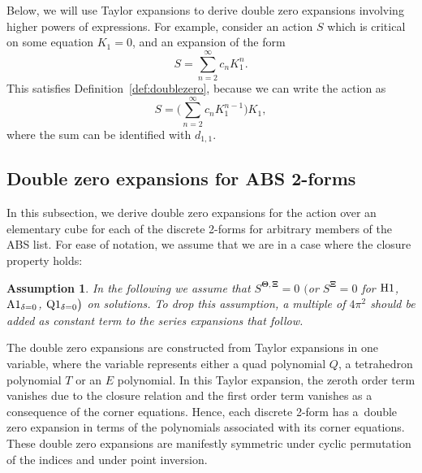 \documentclass[pdftex]{sigma}
\renewcommand{\vec}{\boldsymbol}
\newtheorem{Assumption}[Definition]{Assumption}
\numberwithin{equation}{section}
\begin{document}
Below, we will use Taylor expansions to derive double zero expansions involving higher powers of expressions. For example, consider an action $S$ which is critical on some equation $K_1 = 0$, and an expansion of the form
\[ S = \sum_{n = 2}^\infty c_{n} K_1^n . \]
This satisfies Definition~\ref{def:doublezero}, because we can write the action as
\[ S = \Biggl( \sum_{n = 2}^\infty c_{n} K_1^{n-1} \Biggr) K_1 , \]
where the sum can be identified with $d_{1,1}$.

\subsection{Double zero expansions for ABS 2-forms}
\label{sec-double0-ABS}

In this subsection, we derive double zero expansions for the action over an elementary cube for each of the discrete 2-forms for arbitrary members of the ABS list. For ease of notation, we assume that we are in a case where the closure property holds:

\begin{Assumption}
\label{assumption}
In the following we assume that $S^{\vec \Theta, \vec \Xi} = 0$ $\bigl($or $S^{\vec \Xi} = 0$ for ${\rm H}1$, ${\rm A}1_{\delta=0}$, ${\rm Q}1_{\delta=0}\bigr)$ on solutions. To drop this assumption, a multiple of $4 \pi^2$ should be added as constant term to the series expansions that follow.
\end{Assumption}

The double zero expansions are constructed from Taylor expansions in one variable, where the variable represents either a quad polynomial $Q$, a tetrahedron polynomial $T$ or an $E$ polynomial. In this Taylor expansion, the zeroth order term vanishes due to the closure relation and the first order term vanishes as a consequence of the corner equations. Hence, each discrete 2-form has a~double zero expansion in terms of the polynomials associated with its corner equations. These double zero expansions are manifestly symmetric under cyclic permutation of the indices and under point inversion.
\end{document}
